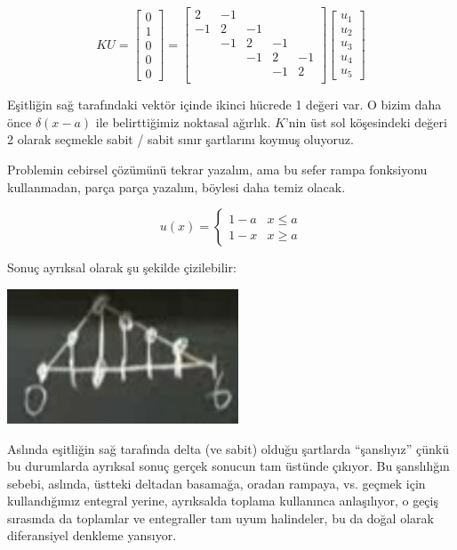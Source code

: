 \documentclass[12pt,fleqn]{article}\usepackage{../../common}
\begin{document}
$$ 
KU = 
\left[\begin{array}{r}
0\\
1\\
0\\
0\\
0
\end{array}\right] 
=
\left[\begin{array}{rrrrr}
2 & -1 & & & \\
-1 & 2 & -1 &  & \\
 &  -1 & 2 & -1 &  \\
 &  & -1 & 2 & -1 \\
 &  & & -1 & 2\\
\end{array}\right]
\left[\begin{array}{r}
u_1\\
u_2\\
u_3\\
u_4\\
u_5
\end{array}\right]
 $$

Eşitliğin sağ tarafındaki vektör içinde ikinci hücrede 1 değeri var. O
bizim daha önce $\delta(x-a)$ ile belirttiğimiz noktasal ağırlık. $K$'nin
üst sol köşesindeki değeri 2 olarak seçmekle sabit / sabit sınır şartlarını
koymuş oluyoruz. 

Problemin cebirsel çözümünü tekrar yazalım, ama bu sefer rampa fonksiyonu
kullanmadan, parça parça yazalım, böylesi daha temiz olacak.

$$ 
u(x) = 
\left\{ \begin{array}{ll}
1-a & x \le a \\
1-x & x \ge a 
\end{array} \right.
 $$

Sonuç ayrıksal olarak şu şekilde çizilebilir:

\includegraphics[height=4cm]{4_14.png}

Aslında eşitliğin sağ tarafında delta (ve sabit) olduğu şartlarda
``şanslıyız'' çünkü bu durumlarda ayrıksal sonuç gerçek sonucun tam üstünde
çıkıyor. Bu şanslılığın sebebi, aslında, üstteki deltadan basamağa, oradan
rampaya, vs. geçmek için kullandığımız entegral yerine, ayrıksalda toplama
kullanınca anlaşılıyor, o geçiş sırasında da toplamlar ve entegraller
tam uyum halindeler, bu da doğal olarak diferansiyel denkleme yansıyor. 
\end{document}
